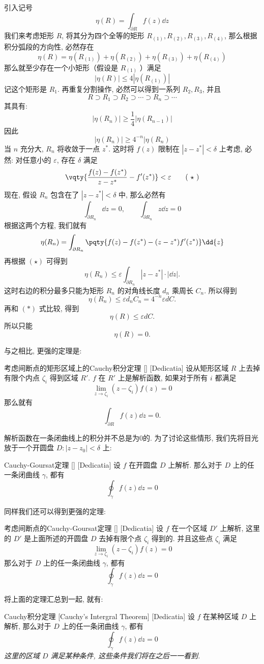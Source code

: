 \documentclass[UTF8]{ctexart}
\begin{document}
\begin{prf}
    引入记号
    \[\eta(R)=\int_{\partial R}f(z)\dd{z}\]
    我们来考虑矩形 \( R \), 将其分为四个全等的矩形 \( R_{(1)}, R_{(2)}, R_{(3)}, R_{(4)} \), 那么根据积分弧段的方向性, 必然存在
    \[\eta(R)=\eta(R_{(1)})+\eta(R_{(2)})+\eta(R_{(3)})+\eta(R_{(4)})\]
    那么就至少存在一个小矩形（假设是 \( R_{(1)} \) ）满足
    \[|\eta(R)|\leqslant 4|\eta(R_{(1)})|\]
    记这个矩形是 \( R_1 \). 再重复分割操作, 必然可以得到一系列 \( R_2, R_3 \), 并且
    \[R\supset R_1\supset R_2\supset\cdots\supset R_n\supset\cdots\]
    其具有: 
    \[|\eta(R_n)|\geqslant \frac{1}{4}|\eta(R_{n-1})|\]
    因此
    \[|\eta(R_n)|\geqslant 4^{-n}|\eta(R_n)\tag{ \( \ast \) }\]
    当 \( n \) 充分大,  \( R_n \) 将收敛于一点 \( z^* \). 这时将 \( f(z) \) 限制在 \( |z-z^*|<\delta  \) 上考虑, 必然: 对任意小的 \( \varepsilon \), 存在 \( \delta \) 满足
    \[\vqty{\frac{f(z)-f(z^*)}{z-z^*}-f'(z^*)}<\varepsilon\tag{ \( \star \) }\]
    现在, 假设 \( R_n \) 包含在了 \( |z-z^*|<\delta \) 中, 那么必然有
    \[\int_{\partial R_n}\dd{z}=0,\qquad\int_{\partial R_n}z\dd{z}=0\]
    根据这两个方程, 我们就有
    \[\eta(R_n)=\int_{\partial R_n}\pqty{f(z)-f(z^*)-(z-z^*)f'(z^*)}\dd{z}\]
    再根据 \( (\star) \) 可得到
    \[\eta(R_n)\leqslant\varepsilon\int_{\partial R_n}|z-z^*|\cdot|\dd z|. \]
    这时右边的积分最多只能为矩形 \( R_n \) 的对角线长度 \( d_n \) 乘周长 \( C_n \). 所以得到
    \[\eta(R_n)\leqslant\varepsilon d_nC_n=4^{-n}\varepsilon dC.\]
    再和 \( (\ast) \) 式比较, 得到
    \[\eta(R)\leqslant\varepsilon dC.\]
    所以只能
    \[\eta(R)=0.\]
\end{prf}
与之相比, 更强的定理是: 
\begin{thm}
    [UUID]
    {考虑间断点的矩形区域上的Cauchy积分定理}
    []
    [Dedicatia]
    设从矩形区域 \( R \) 上去掉有限个内点 \( \zeta_i \) 得到区域 \( R' \).  \( f \) 在 \( R' \) 上是解析函数, 如果对于所有 \( i \) 都满足
    \[\lim_{z\to\zeta_i }(z-\zeta_i)f(z)=0\]
    那么就有
    \[\int_{\partial R}f(z)\dd{z}=0.\]
\end{thm}
解析函数在一条闭曲线上的积分并不总是为0的. 为了讨论这些情形, 我们先将目光放于一个开圆盘 \( D: |z-z_0|<\delta  \) 上:
\begin{thm}
    [UUID]
    {Cauchy-Goursat定理}
    []
    [Dedicatia]
    设 \( f \) 在开圆盘 \( D \) 上解析. 那么对于 \( D \) 上的任一条闭曲线 \( \gamma \), 都有
    \[\oint_\gamma f(z)\dd{z}=0\]
\end{thm}
同样我们还可以得到更强的定理: 
\begin{thm}
    [UUID]
    {考虑间断点的Cauchy-Goursat定理}
    []
    [Dedicatia]
    设 \( f \) 在一个区域 \( D' \) 上解析, 这里的 \( D' \) 是上面所述的开圆盘 \( D \) 去掉有限个点 \( \zeta_i \) 得到的. 并且这些点 \( \zeta_i \) 满足
    \[\lim_{z\to\zeta_i }(z-\zeta_i)f(z)=0\]
    那么对于 \( D \) 上的任一条闭曲线 \( \gamma \), 都有
    \[\oint_\gamma f(z)\dd{z}=0\]
\end{thm}
将上面的定理汇总到一起, 就有: 
\begin{thm}
    [Cauchy]
    {Cauchy积分定理}
    [Cauchy's Intergral Theorem]
    [Dedicatia]
    设 \( f \) 在某种区域 \( D \) 上解析, 那么对于 \( D \) 上的任一条闭曲线 \( \gamma \), 都有
    \[\oint_\gamma f(z)\dd{z}=0\]
    \textit{这里的区域 \( D \) 满足某种条件, 这些条件我们将在之后一一看到. }
\end{thm}
\end{document}

